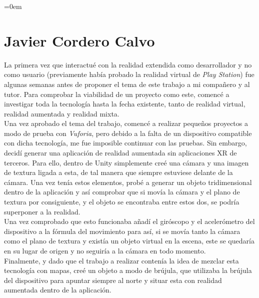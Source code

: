 \parindent=0em
\section{Javier Cordero Calvo}
\noindent

La primera vez que interactué con la realidad extendida como desarrollador y no como usuario (previamente había probado la realidad virtual de \textit{Play Station}) fue algunas semanas antes de proponer el tema de este trabajo a mi compañero y al tutor. Para comprobar la viabilidad de un proyecto como este, comencé a investigar toda la tecnología hasta la fecha existente, tanto de realidad virtual, realidad aumentada y realidad mixta.\\

Una vez aprobado el tema del trabajo, comencé a realizar pequeños proyectos a modo de prueba con \textit{Vuforia}, pero debido a la falta de un dispositivo compatible con dicha tecnología, me fue imposible continuar con las pruebas. Sin embargo, decidí generar una aplicación de realidad aumentada sin aplicaciones XR de terceros. Para ello, dentro de Unity simplemente creé una cámara y una imagen de textura ligada a esta, de tal manera que siempre estuviese delante de la cámara. Una vez tenía estos elementos, probé a generar un objeto tridimensional dentro de la aplicación y así comprobar que si movía la cámara y el plano de textura por consiguiente, y el objeto se encontraba entre estos dos, se podría superponer a la realidad.\\

Una vez comprobado que esto funcionaba añadí el giróscopo y el acelerómetro del dispositivo a la fórmula del movimiento para así, si se movía tanto la cámara como el plano de textura y existía un objeto virtual en la escena, este se quedaría en su lugar de origen y no seguiría a la cámara en todo momento.\\

Finalmente, y dado que el trabajo a realizar contenía la idea de mezclar esta tecnología con mapas, creé un objeto a modo de brújula, que utilizaba la brújula del dispositivo para apuntar siempre al norte y situar esta con realidad aumentada dentro de la aplicación.\\

